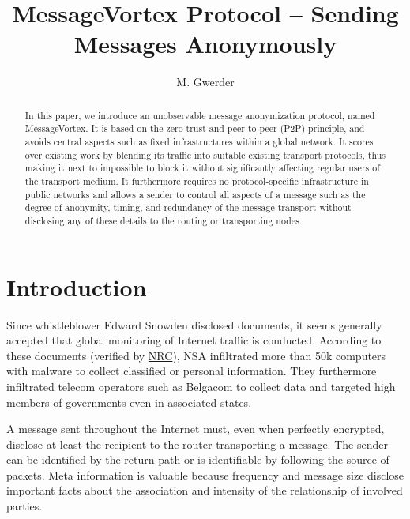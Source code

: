 \documentclass[runningheads]{llncs}
\author{}
\author{M. Gwerder\inst{1,2}\orcidID{0000-0003-0296-5079}}
\institute{University of Basel, Switzerland \and
		University of Applied Sciences of Northwestern of Switzerland\\
		\email{martin.gwerder@fhnw.ch}\\
	}
\begin{document}
%
\title{MessageVortex Protocol -- Sending Messages Anonymously}
%
%
%

%
\maketitle              %
%
\begin{abstract}
In this paper, we introduce an unobservable message anonymization protocol, named MessageVortex. It is based on the zero-trust and peer-to-peer (P2P) principle, and avoids central aspects such as fixed infrastructures within a global network. It scores over existing work by blending its traffic into suitable existing transport protocols, thus making it next to impossible to block it without significantly affecting regular users of the transport medium. It furthermore requires no protocol-specific infrastructure in public networks and allows a sender to control all aspects of a message such as the degree of anonymity, timing, and redundancy of the message transport without disclosing any of these details to the routing or transporting nodes.

\end{abstract}
%
%
%
\section{Introduction}
Since whistleblower Edward Snowden disclosed documents, it seems generally accepted that global monitoring of Internet traffic is conducted. According to these documents (verified by \href{http://www.nrc.nl/nieuws/2013/11/23/nederland-sinds-1946-doelwit-van-nsa}{NRC}), NSA infiltrated more than 50k computers with malware to collect classified or personal information. They furthermore infiltrated telecom operators such as Belgacom to collect data and targeted high members of governments even in associated states. 

A message sent throughout the Internet must, even when perfectly encrypted, disclose at least the recipient to the router transporting a message. The sender can be identified by the return path or is identifiable by following the source of packets. Meta information is valuable because frequency and message size disclose important facts about the association and intensity of the relationship of involved parties. %
\end{document}
